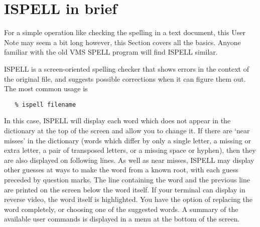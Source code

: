  \newpage
 \begin{latexonly}
   \setlength{\parskip}{0mm}
   \latexonlytoc
   \setlength{\parskip}{\medskipamount}
   \markright{\stardocname}
 \end{latexonly}
\newpage
\renewcommand{\thepage}{\arabic{page}}
\setcounter{page}{1}

\section{ISPELL in brief}

For a simple operation like checking the spelling in a text document, this User
Note may seem a bit long \sunspec{--}{-} however, this Section covers all the 
basics. 
Anyone familiar with the old VMS SPELL program will find ISPELL similar.

ISPELL is a screen-oriented spelling checker that shows errors in the context
of the original file, and suggests possible corrections when it can figure
them out.  The most common usage is

\begin{verbatim}
   % ispell filename
\end{verbatim}

In this case, ISPELL will display each word which does not appear in the
dictionary at the top of the screen and allow you to change it.
If there are `near misses' in the dictionary (words which differ by only a
single letter, a missing or extra letter, a pair of transposed letters, or a
missing space or hyphen), then they are also displayed on following lines.
As well as near misses, ISPELL may display other guesses at ways to make the
word from a known root, with each guess preceded by question marks.
The line containing the word and the previous line
are printed on the screen below the word itself. If your terminal can
display in reverse video, the word itself is highlighted.  You have the
option of replacing the word completely, or choosing one of the suggested
words.  A summary of the available user commands is displayed in a menu at the
bottom of the screen.

